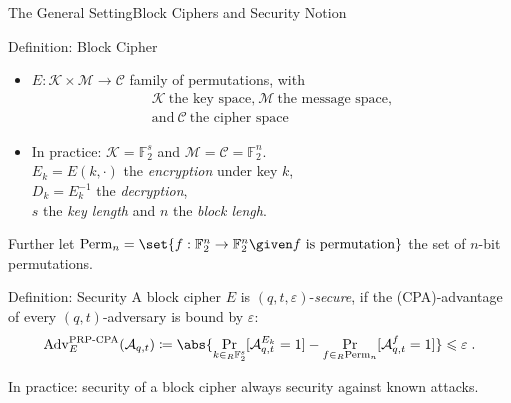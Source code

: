 \documentclass[%
    10pt,
    professionalfont,
    aspectratio=169,
    handout,
]{beamer}
\DeclareMathOperator*{\Prob}{Pr}
\newcommand{\F}{\mathbb{F}}
\begin{document}
\begin{frame}{The General Setting}{Block Ciphers and Security Notion}
    \centering
    \begin{block}{Definition: Block Cipher}
    \begin{minipage}{0.50\textwidth}
        \begin{itemize}
            \item $E : \mathcal{K} \times \mathcal{M} \to \mathcal{C}$ family of permutations, with
                \vspace{-5pt}
                \begin{gather*}
                    \mathcal{K}\ \text{the key space,}\ \mathcal{M}\ \text{the message space,}\\
                    \text{and}\ \mathcal{C}\ \text{the cipher space}
                \end{gather*}
        \end{itemize}
    \end{minipage}%
    \hspace{5pt}%
    \begin{minipage}{0.45\textwidth}
        \begin{itemize}
            \item In practice: $\mathcal{K} = \F_2^s$ and $\mathcal{M} = \mathcal{C} = \F_2^n$.\\
                  $E_k = E(k, \cdot)$ the \emph{encryption} under key $k$,\\
                  $D_k = E_k^{-1}$ the \emph{decryption},\\
                  $s$ the \emph{key length} and $n$ the \emph{block lengh}.
        \end{itemize}
    \end{minipage}
    \end{block}

    \pause
    Further let $\mathrm{Perm}_n = \set{f : \F_2^n \to \F_2^n \given f\ \text{is permutation}}$ the set of $n$-bit permutations.

    \begin{block}{Definition: Security}
        A block cipher $E$ is $(q,t,\varepsilon)$-\emph{secure}, if the (CPA)-advantage of every $(q,t)$-adversary is bound by $\varepsilon$:
        \begin{equation*}
            \mathrm{Adv}^{\text{PRP-CPA}}_{E}(\mathcal{A}_{q,t}) \coloneqq \abs{\Prob_{k \in_R \F_2^s}[\mathcal{A}^{E_k}_{q,t} = 1] - \Prob_{f \in_R \mathrm{Perm}_n}[\mathcal{A}^{f}_{q,t} = 1]} \leqslant \varepsilon\;.
        \end{equation*}
    \end{block}
    \pause

    \vfill
    In practice: security of a block cipher always security against known attacks.
\end{frame}
\end{document}
